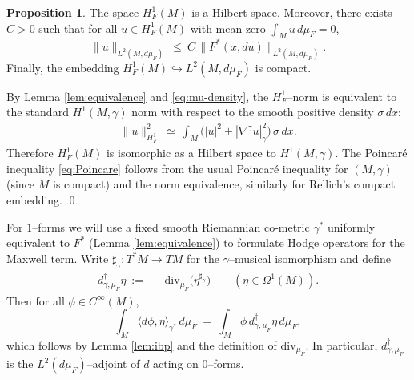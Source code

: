 \documentclass[fleqn,11pt,twoside]{article}
\makeatletter
\renewenvironment{proof}[1][\proofname]{\par
  \normalfont
  \topsep6\p@\@plus6\p@ \trivlist
  \item[\hskip\labelsep\textbf{%
    #1\@addpunct{.}}]\ignorespaces
}{%
  \qed\endtrivlist
}
\theoremstyle{definition}
\newtheorem{proposition}{Proposition}
\makeatother
\begin{document}
\begin{proposition}\label{prop:poincare-rellich}
The space $H^1_F(M)$ is a Hilbert space.
Moreover, there exists $C>0$ such that for all $u\in H^1_F(M)$ with mean zero $\int_M u\,d\mu_F=0$,
\begin{equation}\label{eq:Poincare}
   \|u\|_{L^2(M,d\mu_F)}\ \le\ C\, \|F^*(x,du)\|_{L^2(M,d\mu_F)}.
\end{equation}
Finally, the embedding $H^1_F(M)\hookrightarrow L^2(M,d\mu_F)$ is compact.
\end{proposition}

\begin{proof}
By Lemma \ref{lem:equivalence} and \eqref{eq:mu-density}, the $H^1_F$--norm is equivalent to the standard
$H^1(M,\gamma)$ norm with respect to the smooth positive density $\sigma\,dx$:
\begin{align*}
\|u\|_{H^1_F}^2\ \simeq\ \int_M \big( |u|^2 + |\nabla^\gamma u|_\gamma^2\big)\,\sigma\,dx.
\end{align*}
Therefore $H^1_F(M)$ is isomorphic as a Hilbert space to $H^1(M,\gamma)$. The Poincar\'e inequality \eqref{eq:Poincare} follows from the usual Poincar\'e inequality for $(M,\gamma)$
(since $M$ is compact) and the norm equivalence, similarly for Rellich's compact embedding.
\end{proof}


For $1$--forms we will use a fixed smooth Riemannian co-metric $\gamma^*$ uniformly equivalent to $F^*$
(Lemma \ref{lem:equivalence}) to formulate Hodge operators for the Maxwell term. Write $\sharp_\gamma:T^*M\to TM$ for the $\gamma$--musical isomorphism and define
\begin{align*}
  d^\dagger_{\gamma,\mu_F}\eta\ :=\ -\,\mathrm{div}_{\mu_F}\!\big(\eta^{\sharp_\gamma}\big)
  \qquad(\eta\in\Omega^1(M)).
\end{align*}
Then for all $\phi\in C^\infty(M)$,
\begin{equation}\label{eq:adjoint}
   \int_M \langle d\phi,\eta\rangle_{\gamma^*}\, d\mu_F\ =\ \int_M \phi\, d^\dagger_{\gamma,\mu_F}\eta\, d\mu_F,
\end{equation}
which follows by Lemma \ref{lem:ibp} and the definition of $\mathrm{div}_{\mu_F}$. In particular, $d^\dagger_{\gamma,\mu_F}$ is the $L^2(d\mu_F)$--adjoint of $d$ acting on $0$--forms.
\end{document}
